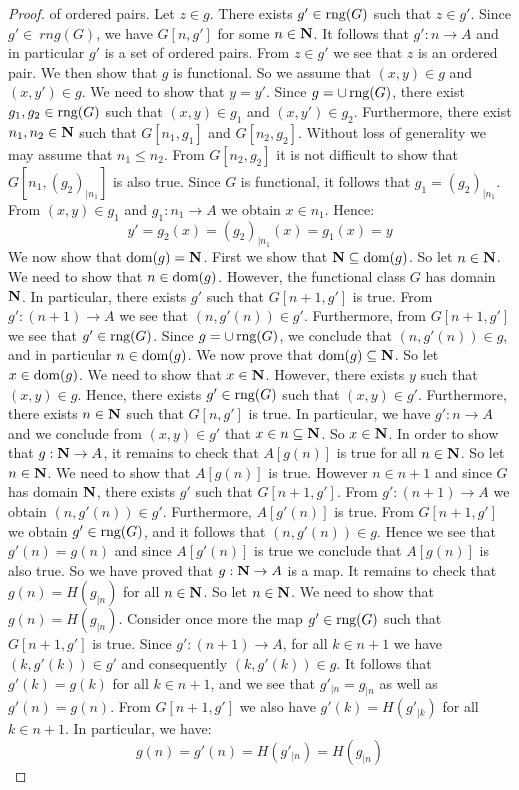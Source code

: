 \begin{proof}
of ordered pairs. Let $z\in g$. There exists $g'\in \mbox{\rm rng}(G)$ such
that $z\in g'$. Since $g'\in\ rng(G)$, we have $G[n,g']$ for some
$n\in\mbox{$\bf N$}$. It follows that $g':n\to A$ and in particular $g'$ is a
set of ordered pairs. From $z\in g'$ we see that $z$ is an ordered
pair. We then show that $g$ is functional. So we assume that
$(x,y)\in g$ and $(x,y')\in g$. We need to show that $y=y'$. Since
$g=\cup\,\mbox{\rm rng}(G)$, there exist $g_{1},g_{2}\in \mbox{\rm rng}(G)$ such that
$(x,y)\in g_{1}$ and $(x,y')\in g_{2}$. Furthermore, there exist
$n_{1},n_{2}\in\mbox{$\bf N$}$ such that $G[n_{1},g_{1}]$ and $G[n_{2},g_{2}]$.
Without loss of generality we may assume that $n_{1}\leq n_{2}$.
From $G[n_{2},g_{2}]$ it is not difficult to show that
$G[n_{1},(g_{2})_{|n_{1}}]$ is also true. Since $G$ is functional,
it follows that $g_{1}=(g_{2})_{|n_{1}}$. From $(x,y)\in g_{1}$ and
$g_{1}:n_{1}\to A$ we obtain $x\in n_{1}$. Hence:
    \[
    y'=g_{2}(x)=(g_{2})_{|n_{1}}(x)=g_{1}(x)=y
    \]
We now show that $\mbox{\rm dom}(g)=\mbox{$\bf N$}$. First we show that $\mbox{$\bf N$}\subseteq
\mbox{\rm dom}(g)$. So let $n\in\mbox{$\bf N$}$. We need to show that $n\in \mbox{\rm dom}(g)$.
However, the functional class $G$ has domain $\mbox{$\bf N$}$. In particular,
there exists $g'$ such that $G[n+1,g']$ is true. From $g':(n+1)\to
A$ we see that $(n,g'(n))\in g'$. Furthermore, from $G[n+1,g']$ we
see that $g'\in \mbox{\rm rng}(G)$. Since $g=\cup\,\mbox{\rm rng}(G)$, we conclude that
$(n,g'(n))\in g$, and in particular $n\in \mbox{\rm dom}(g)$. We now prove
that $\mbox{\rm dom}(g)\subseteq\mbox{$\bf N$}$. So let $x\in \mbox{\rm dom}(g)$. We need to show
that $x\in\mbox{$\bf N$}$. However, there exists $y$ such that $(x,y)\in g$.
Hence, there exists $g'\in \mbox{\rm rng}(G)$ such that $(x,y)\in g'$.
Furthermore, there exists $n\in\mbox{$\bf N$}$ such that $G[n,g']$ is true. In
particular, we have $g':n\to A$ and we conclude from $(x,y)\in g'$
that $x\in n\subseteq\mbox{$\bf N$}$. So $x\in\mbox{$\bf N$}$. In order to show that
$g:\mbox{$\bf N$}\to A$, it remains to check that $A[g(n)]$ is true for all
$n\in\mbox{$\bf N$}$. So let $n\in\mbox{$\bf N$}$. We need to show that $A[g(n)]$ is true.
However $n\in n+1$ and since $G$ has domain $\mbox{$\bf N$}$, there exists $g'$
such that $G[n+1,g']$. From $g':(n+1)\to A$ we obtain $(n,g'(n))\in
g'$. Furthermore, $A[g'(n)]$ is true. From $G[n+1,g']$ we obtain
$g'\in \mbox{\rm rng}(G)$, and it follows that $(n,g'(n))\in g$. Hence we see
that $g'(n)=g(n)$ and since $A[g'(n)]$ is true we conclude that
$A[g(n)]$ is also true. So we have proved that $g:\mbox{$\bf N$}\to A$ is a map.
It remains to check that $g(n)=H(g_{|n})$ for all $n\in\mbox{$\bf N$}$. So let
$n\in\mbox{$\bf N$}$. We need to show that $g(n)=H(g_{|n})$. Consider once more
the map $g'\in \mbox{\rm rng}(G)$ such that $G[n+1,g']$ is true. Since
$g':(n+1)\to A$, for all $k\in n+1$ we have $(k,g'(k))\in g'$ and
consequently $(k,g'(k))\in g$. It follows that $g'(k)=g(k)$ for all
$k\in n+1$, and we see that $g'_{|n}=g_{|n}$ as well as
$g'(n)=g(n)$. From $G[n+1,g']$ we also have $g'(k)=H(g'_{|k})$ for
all $k\in n+1$. In particular, we have:
    \[
    g(n)=g'(n)=H(g'_{|n})=H(g_{|n})
    \]
\end{proof}
